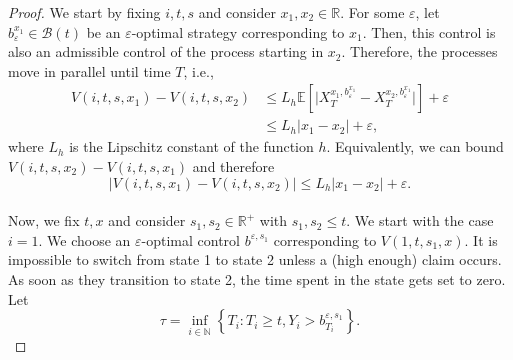 \documentclass[a4paper]{scrartcl}
\theoremstyle{remark}
\theoremstyle{definition}
\numberwithin{equation}{section}
\begin{document}
\begin{proof}
    We start by fixing $i,t,s$ and consider $x_1,x_2 \in \mathbb{R}$. For some $\varepsilon$, let $b_\varepsilon^{x_1} \in \mathcal{B}(t)$ be an $\varepsilon$-optimal strategy corresponding to $x_1$. Then, this control is also an admissible control of the process starting in $x_2$. Therefore, the processes move in parallel until time $T$, i.e.,
    \begin{align*}
        V(i,t,s,x_1)-V(i,t,s,x_2)   &\leq L_h \mathbb{E} \left[\big |X_T^{x_1,b_\varepsilon^{x_1}} - X_T^{x_2,b_\varepsilon^{x_1}}\big|\right]+\varepsilon\\
                                &\leq L_h |x_1-x_2|+\varepsilon,
    \end{align*}
    where $L_h$ is the Lipschitz constant of the function $h$. Equivalently, we can bound $V(i,t,s,x_2)-V(i,t,s,x_1)$ and therefore 
    \begin{equation*}
        |V(i,t,s,x_1)-V(i,t,s,x_2)| \leq L_h |x_1-x_2|+\varepsilon.
    \end{equation*}\\
    Now, we fix $t,x$ and consider $s_1,s_2 \in \mathbb{R}^+$ with $s_1, s_2 \leq t$. We start with the case $i=1$. We choose an $\varepsilon$-optimal control $b^{\varepsilon, s_1}$ corresponding to $V(1,t,s_1,x)$. It is impossible to switch from state 1 to state 2 unless a (high enough) claim occurs. As soon as they transition to state 2, the time spent in the state gets set to zero. Let 
    \begin{equation*}
      \tau =  \inf_{i \in \mathbb{N}}\left\{T_i:T_i \geq t, Y_i>b_{T_i}^{\varepsilon, s_1}\right\}. 
    \end{equation*}
    

\end{proof}
\end{document}
